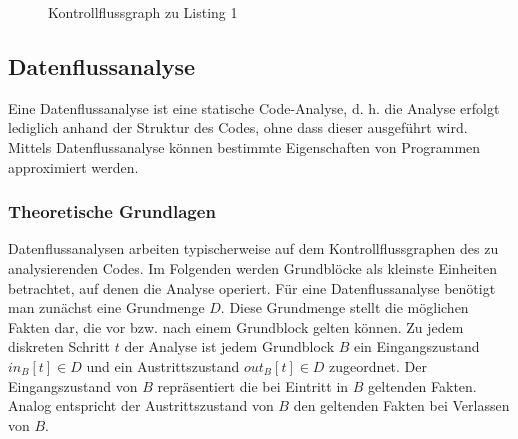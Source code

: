 \begin{figure}[H]
\centering
{}
\caption{Kontrollflussgraph zu Listing 1}
\end{figure}

\par

\subsection{Datenflussanalyse}
Eine Datenflussanalyse ist eine statische Code-Analyse, d. h. die Analyse erfolgt lediglich anhand der Struktur des Codes, ohne dass dieser ausgeführt wird. 
Mittels Datenflussanalyse können bestimmte Eigenschaften von Programmen approximiert werden.

\subsubsection{Theoretische Grundlagen}

Datenflussanalysen arbeiten typischerweise auf dem Kontrollflussgraphen des zu analysierenden Codes.
Im Folgenden werden Grundblöcke als kleinste Einheiten betrachtet, auf denen die Analyse operiert.
Für eine Datenflussanalyse benötigt man zunächst eine Grundmenge $D$.
Diese Grundmenge stellt die möglichen Fakten dar, die vor bzw. nach einem Grundblock gelten können.
Zu jedem diskreten Schritt $t$ der Analyse ist jedem Grundblock $B$ ein Eingangszustand $in_B[t] \in D$ und ein Austrittszustand $out_B[t] \in D$ zugeordnet.
Der Eingangszustand von $B$ repräsentiert die bei Eintritt in $B$ geltenden Fakten.
Analog entspricht der Austrittszustand von $B$ den geltenden Fakten bei Verlassen von $B$.

